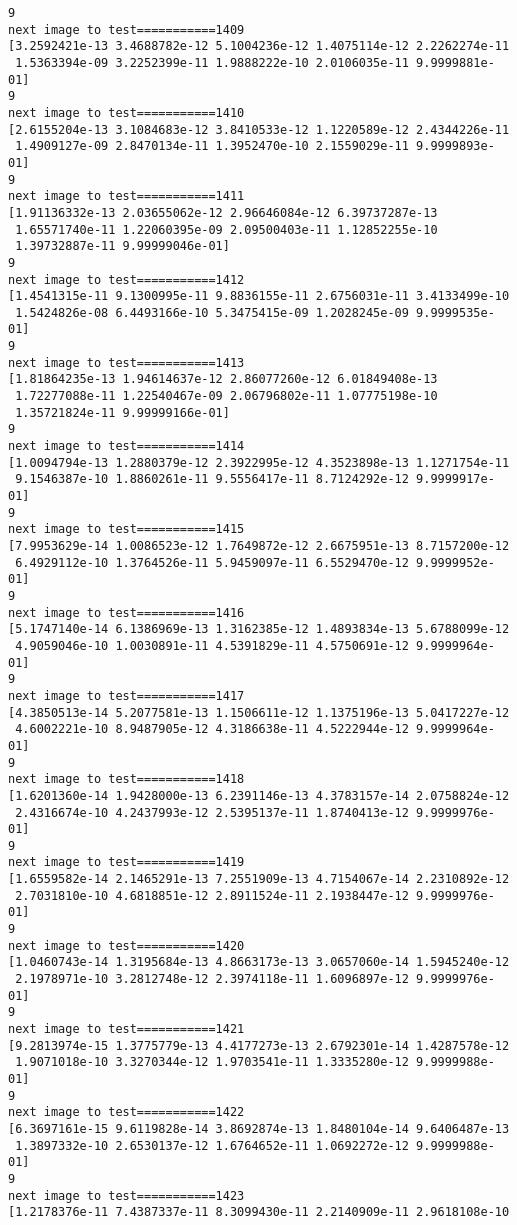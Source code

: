 \documentclass[11pt]{article}
\begin{document}
\begin{Verbatim}[commandchars=\\\{\}]
9
next image to test===========1409
[3.2592421e-13 3.4688782e-12 5.1004236e-12 1.4075114e-12 2.2262274e-11
 1.5363394e-09 3.2252399e-11 1.9888222e-10 2.0106035e-11 9.9999881e-01]
9
next image to test===========1410
[2.6155204e-13 3.1084683e-12 3.8410533e-12 1.1220589e-12 2.4344226e-11
 1.4909127e-09 2.8470134e-11 1.3952470e-10 2.1559029e-11 9.9999893e-01]
9
next image to test===========1411
[1.91136332e-13 2.03655062e-12 2.96646084e-12 6.39737287e-13
 1.65571740e-11 1.22060395e-09 2.09500403e-11 1.12852255e-10
 1.39732887e-11 9.99999046e-01]
9
next image to test===========1412
[1.4541315e-11 9.1300995e-11 9.8836155e-11 2.6756031e-11 3.4133499e-10
 1.5424826e-08 6.4493166e-10 5.3475415e-09 1.2028245e-09 9.9999535e-01]
9
next image to test===========1413
[1.81864235e-13 1.94614637e-12 2.86077260e-12 6.01849408e-13
 1.72277088e-11 1.22540467e-09 2.06796802e-11 1.07775198e-10
 1.35721824e-11 9.99999166e-01]
9
next image to test===========1414
[1.0094794e-13 1.2880379e-12 2.3922995e-12 4.3523898e-13 1.1271754e-11
 9.1546387e-10 1.8860261e-11 9.5556417e-11 8.7124292e-12 9.9999917e-01]
9
next image to test===========1415
[7.9953629e-14 1.0086523e-12 1.7649872e-12 2.6675951e-13 8.7157200e-12
 6.4929112e-10 1.3764526e-11 5.9459097e-11 6.5529470e-12 9.9999952e-01]
9
next image to test===========1416
[5.1747140e-14 6.1386969e-13 1.3162385e-12 1.4893834e-13 5.6788099e-12
 4.9059046e-10 1.0030891e-11 4.5391829e-11 4.5750691e-12 9.9999964e-01]
9
next image to test===========1417
[4.3850513e-14 5.2077581e-13 1.1506611e-12 1.1375196e-13 5.0417227e-12
 4.6002221e-10 8.9487905e-12 4.3186638e-11 4.5222944e-12 9.9999964e-01]
9
next image to test===========1418
[1.6201360e-14 1.9428000e-13 6.2391146e-13 4.3783157e-14 2.0758824e-12
 2.4316674e-10 4.2437993e-12 2.5395137e-11 1.8740413e-12 9.9999976e-01]
9
next image to test===========1419
[1.6559582e-14 2.1465291e-13 7.2551909e-13 4.7154067e-14 2.2310892e-12
 2.7031810e-10 4.6818851e-12 2.8911524e-11 2.1938447e-12 9.9999976e-01]
9
next image to test===========1420
[1.0460743e-14 1.3195684e-13 4.8663173e-13 3.0657060e-14 1.5945240e-12
 2.1978971e-10 3.2812748e-12 2.3974118e-11 1.6096897e-12 9.9999976e-01]
9
next image to test===========1421
[9.2813974e-15 1.3775779e-13 4.4177273e-13 2.6792301e-14 1.4287578e-12
 1.9071018e-10 3.3270344e-12 1.9703541e-11 1.3335280e-12 9.9999988e-01]
9
next image to test===========1422
[6.3697161e-15 9.6119828e-14 3.8692874e-13 1.8480104e-14 9.6406487e-13
 1.3897332e-10 2.6530137e-12 1.6764652e-11 1.0692272e-12 9.9999988e-01]
9
next image to test===========1423
[1.2178376e-11 7.4387337e-11 8.3099430e-11 2.2140909e-11 2.9618108e-10

\end{Verbatim}
\end{document}

